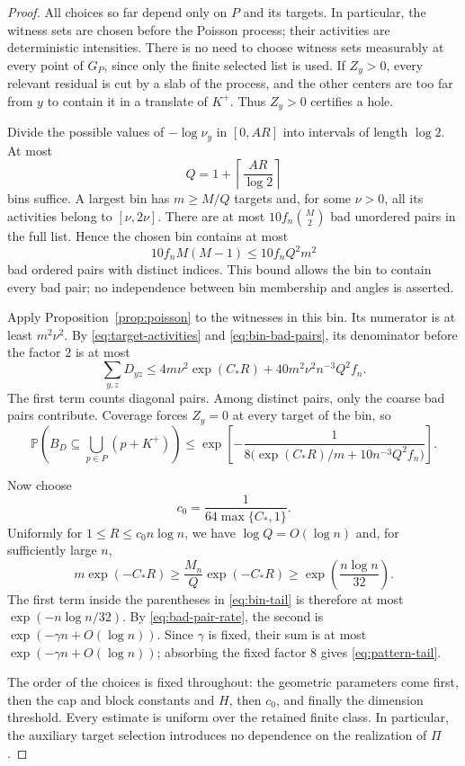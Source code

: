 \begin{proof}
All choices so far depend only on $P$ and its targets.  In particular,
the witness sets are chosen before the Poisson process; their activities
are deterministic intensities.  There is no need to choose witness sets
measurably at every point of $G_P$, since only the finite selected list
is used.  If $Z_y>0$, every relevant residual is cut by a slab of the
process, and the other centers are too far from $y$ to contain it in a
translate of $K^+$.  Thus $Z_y>0$ certifies a hole.

Divide the possible values of $-\log\nu_y$ in $[0,AR]$ into intervals
of length $\log2$.  At most
\[
 Q=1+\left\lceil\frac{AR}{\log2}\right\rceil
\]
bins suffice.  A largest bin has $m\ge M/Q$ targets and, for some
$\nu>0$, all its activities belong to $[\nu,2\nu]$.
There are at most $10f_n\binom M2$ bad unordered pairs in the full
list.  Hence the chosen bin contains at most
\begin{equation}
 10f_nM(M-1)\le10f_nQ^2m^2
\label{eq:bin-bad-pairs}
\end{equation}
bad ordered pairs with distinct indices.
This bound allows the bin to contain every bad pair; no independence
between bin membership and angles is asserted.

Apply Proposition~\ref{prop:poisson} to the witnesses in this bin.
Its numerator is at least $m^2\nu^2$.  By
\eqref{eq:target-activities} and \eqref{eq:bin-bad-pairs}, its denominator
before the factor $2$ is at most
\[
 \sum_{y,z}D_{yz}
 \le4m\nu^2\exp(C_*R)
       +40m^2\nu^2n^{-3}Q^2f_n.
\]
The first term counts diagonal pairs.  Among distinct pairs, only the
coarse bad pairs contribute.  Coverage forces $Z_y=0$ at every target
of the bin, so
\begin{equation}
 \mathbb P\left(B_D\subseteq\bigcup_{p\in P}(p+K^+)\right)
 \le\exp\left[-\frac1{
 8\bigl(\exp(C_*R)/m+10n^{-3}Q^2f_n\bigr)}\right].
\label{eq:bin-tail}
\end{equation}

Now choose
\[
 c_0=\frac1{64\max\{C_*,1\}}.
\]
Uniformly for $1\le R\le c_0n\log n$, we have $\log Q=O(\log n)$ and,
for sufficiently large $n$,
\[
 m\exp(-C_*R)
 \ge\frac{M_n}{Q}\exp(-C_*R)
 \ge\exp\left(\frac{n\log n}{32}\right).
\]
The first term inside the parentheses in \eqref{eq:bin-tail} is
therefore at most $\exp(-n\log n/32)$.  By
\eqref{eq:bad-pair-rate}, the second is
$\exp(-\gamma n+O(\log n))$.
Since $\gamma$ is fixed, their sum is at most
$\exp(-\gamma n+O(\log n))$; absorbing the fixed factor $8$ gives
\eqref{eq:pattern-tail}.

The order of the choices is fixed throughout: the geometric parameters
come first, then the cap and block constants and $H$, then $c_0$, and
finally the dimension threshold.  Every estimate is uniform over the
retained finite class.  In particular, the auxiliary target selection
introduces no dependence on the realization of $\Pi$.
\end{proof}
